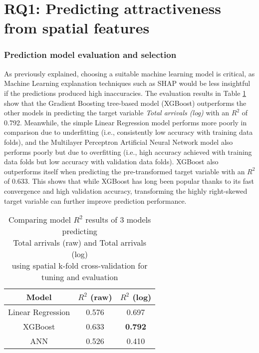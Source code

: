 
\section{RQ1: Predicting attractiveness from spatial features}
\subsubsection*{Prediction model evaluation and selection}

As previously explained, choosing a suitable machine learning model is critical, as Machine Learning explanation techniques such as SHAP would be less insightful if the predictions produced high inaccuracies. The evaluation results in Table \ref{tab:modeleval} show that the Gradient Boosting tree-based model (XGBoost) outperforms the other models in predicting the target variable \textit{Total arrivals (log)} with an $R^2$ of 0.792. Meanwhile, the simple Linear Regression model performs more poorly in comparison due to underfitting (i.e., consistently low accuracy with training data folds), and the Multilayer Perceptron Artificial Neural Network model also performs poorly but due to overfitting (i.e., high accuracy achieved with training data folds but low accuracy with validation data folds). XGBoost also outperforms itself when predicting the pre-transformed target variable with an $R^2$ of 0.633. This shows that while XGBoost has long been popular thanks to its fast convergence and high validation accuracy, transforming the highly right-skewed target variable can further improve prediction performance. 

\begin{table}[ht]
    \centering
    \renewcommand{\arraystretch}{1.5}
    \begin{tabular}{|c|c|c|}
        \hline
        \rowcolor{lightgray}
        \textbf{Model} & \textbf{$R^2$ (raw)} & \textbf{$R^2$ (log)} \\
        \hline
        Linear Regression & 0.576 & 0.697 \\
        \rowcolor{pink}
        XGBoost & 0.633 & \textbf{0.792} \\
        ANN & 0.526 & 0.410\\
        \hline
    \end{tabular}
    \captionsetup{justification=centering}
    \caption{Comparing model $R^2$ results of 3 models predicting \\Total arrivals (raw) and Total arrivals (log) \\using spatial k-fold cross-validation for tuning and evaluation}
    \label{tab:modeleval}
\end{table}

